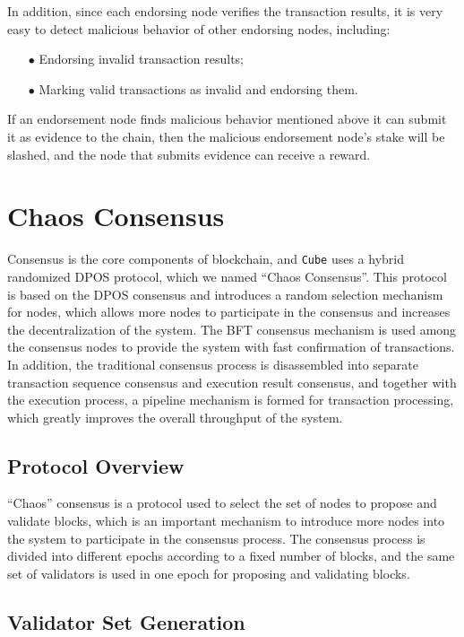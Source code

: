 \documentclass{iacrtrans}
\begin{document}
In addition, since each endorsing node verifies the transaction results, it is very easy to detect malicious behavior of other endorsing nodes, including:

\begin{itemize}
	\item[$\bullet$] Endorsing invalid transaction results;
	\item[$\bullet$] Marking valid transactions as invalid and endorsing them.
\end{itemize}

If an endorsement node finds malicious behavior mentioned above it can submit it as evidence to the chain, then the malicious endorsement node's stake will be slashed, and the node that submits evidence can receive a reward.


\section{Chaos Consensus}
Consensus is the core components of blockchain, and \texttt{Cube} uses a hybrid randomized DPOS protocol, which we named “Chaos Consensus”. This protocol is based on the DPOS consensus and introduces a random selection mechanism for nodes, which allows more nodes to participate in the consensus and increases the decentralization of the system. The BFT consensus mechanism is used among the consensus nodes to provide the system with fast confirmation of transactions. In addition, the traditional consensus process is disassembled into separate transaction sequence consensus and execution result consensus, and together with the execution process, a pipeline mechanism is formed for transaction processing, which greatly improves the overall throughput of the system.


\subsection{Protocol Overview}
“Chaos” consensus is a protocol used to select the set of nodes to propose and validate blocks, which is an important mechanism to introduce more nodes into the system to participate in the consensus process. The consensus process is divided into different epochs according to a fixed number of blocks, and the same set of validators is used in one epoch for proposing and validating blocks.


\subsection{Validator Set Generation}
\end{document}
